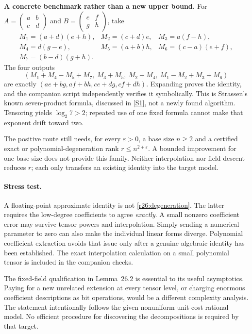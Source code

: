 \documentclass[11pt,a4paper]{article}
\newcommand{\sref}[2]{\hyperlink{source:#1:#2}{[S#2]}}
\numberwithin{equation}{section}
\begin{document}
\medskip
\textbf{A concrete benchmark rather than a new upper bound.}
For
$A=\left(\begin{smallmatrix}a&b\\c&d\end{smallmatrix}\right)$ and
$B=\left(\begin{smallmatrix}e&f\\g&h\end{smallmatrix}\right)$, take
\[
\begin{array}{lll}
 M_1=(a+d)(e+h),&M_2=(c+d)e,&M_3=a(f-h),\\
 M_4=d(g-e),&M_5=(a+b)h,&M_6=(c-a)(e+f),\\
 M_7=(b-d)(g+h).&&
\end{array}
\]
The four outputs
\[
 (M_1+M_4-M_5+M_7,\ M_3+M_5,\ M_2+M_4,\ M_1-M_2+M_3+M_6)
\]
are exactly $(ae+bg,af+bh,ce+dg,cf+dh)$. Expanding proves the identity,
and the companion script independently verifies it symbolically. This
is Strassen's known seven-product formula, discussed in \sref{statement}{1},
not a newly found algorithm. Tensoring yields $\log_2 7>2$; repeated
use of one fixed formula cannot make that exponent drift toward two.

The positive route still needs, for every $\varepsilon>0$, a base size
$n\ge2$ and a certified exact or polynomial-degeneration rank
$r\le n^{2+\varepsilon}$. A bounded improvement for one base size does
not provide this family. Neither interpolation nor field descent reduces
$r$; each only transfers an existing identity into the target model.

\paragraph{Stress test.}
A floating-point approximate identity is not
\eqref{r26:degeneration}. The latter requires the low-degree coefficients
to agree \emph{exactly}. A small nonzero coefficient error may survive
tensor powers and interpolation. Simply sending a numerical parameter
to zero can also make the individual linear forms diverge. Polynomial
coefficient extraction avoids that issue only after a genuine algebraic
identity has been established. The exact interpolation calculation on
a small polynomial tensor is included in the companion checks.

The fixed-field qualification in Lemma~26.2 is essential to its useful
asymptotics. Paying for a new unrelated extension at every tensor level,
or charging enormous coefficient descriptions as bit operations, would
be a different complexity analysis. The statement intentionally follows
the given nonuniform unit-cost rational model. No efficient procedure
for discovering the decompositions is required by that target.
\end{document}
